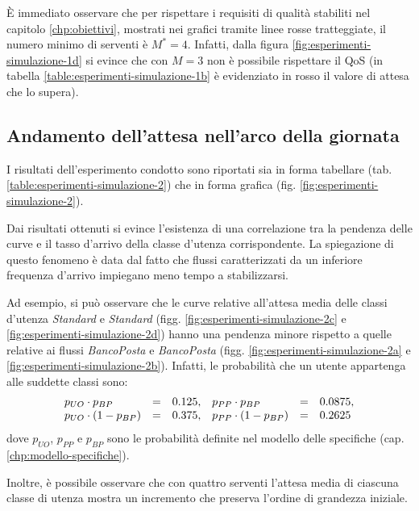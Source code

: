 È immediato osservare che per rispettare i requisiti di qualità stabiliti nel capitolo \ref{chp:obiettivi}, mostrati nei grafici tramite linee rosse tratteggiate, il numero minimo di serventi è $M^* = 4$. Infatti, dalla figura \ref{fig:esperimenti-simulazione-1d} si evince che con $M = 3$ non è possibile rispettare il QoS (in tabella \ref{table:esperimenti-simulazione-1b} è evidenziato in {\color{red}rosso} il valore di  attesa che lo supera).

\subsection*{Andamento dell'attesa nell'arco della giornata}
I risultati dell'esperimento condotto sono riportati sia in forma tabellare (tab. \ref{table:esperimenti-simulazione-2}) che in forma grafica (fig. \ref{fig:esperimenti-simulazione-2}).

Dai risultati ottenuti si evince l'esistenza di una correlazione tra la pendenza delle curve e il tasso d'arrivo della classe d'utenza corrispondente. La spiegazione di questo fenomeno è data dal fatto che flussi caratterizzati da un inferiore frequenza d'arrivo impiegano meno tempo a stabilizzarsi.

Ad esempio, si può osservare che le curve relative all'attesa media delle classi d'utenza \uo{} \textsl{Standard} e \pp{} \textsl{Standard} (figg. \ref{fig:esperimenti-simulazione-2c} e \ref{fig:esperimenti-simulazione-2d}) hanno una pendenza minore rispetto a quelle relative ai flussi \uo{} \textsl{BancoPosta} e \pp{} \textsl{BancoPosta} (figg. \ref{fig:esperimenti-simulazione-2a} e \ref{fig:esperimenti-simulazione-2b}). Infatti, le probabilità che un utente appartenga alle suddette classi sono:
\begin{equation*}
\begin{array}{l l l l l l}
p_{UO} \cdot p_{BP} & = & 0.125, & p_{PP} \cdot p_{BP} & = & 0.0875, \\
p_{UO} \cdot (1 - p_{BP}) & = & 0.375, & p_{PP} \cdot (1 - p_{BP}) & = & 0.2625
\end{array}
\end{equation*}
dove $p_{UO}$, $p_{PP}$ e $p_{BP}$ sono le probabilità definite nel modello delle specifiche (cap. \ref{chp:modello-specifiche}).

Inoltre, è possibile osservare che con quattro serventi l'attesa media di ciascuna classe di utenza mostra un incremento che preserva l'ordine di grandezza iniziale.

